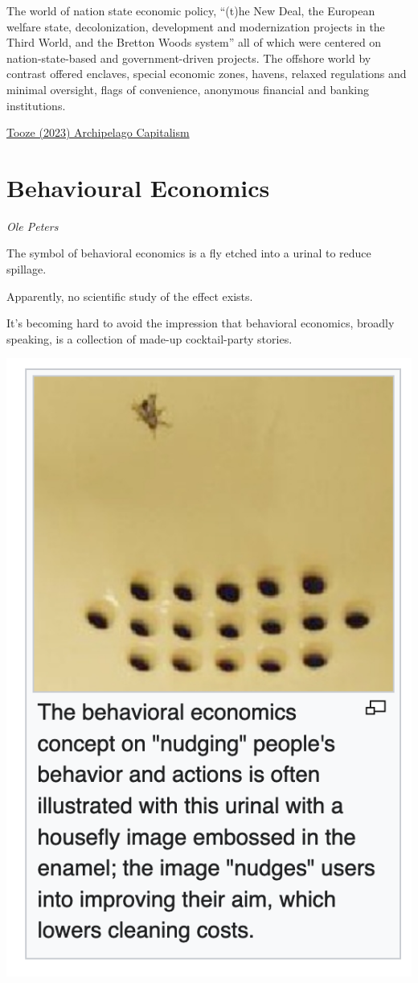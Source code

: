 \documentclass[
]{book}
\begin{document}
The world of nation state economic policy, ``(t)he New Deal, the European welfare state, decolonization, development and modernization projects in the Third World, and the Bretton Woods system'' all of which were centered on nation-state-based and government-driven projects. The offshore world by contrast offered enclaves, special economic zones, havens, relaxed regulations and minimal oversight, flags of convenience, anonymous financial and banking institutions.

\href{https://adamtooze.substack.com/p/chartbook-188-archipelago-capitalism}{Tooze (2023) Archipelago Capitalism}

\hypertarget{behavioural-economics}{%
\chapter{Behavioural Economics}\label{behavioural-economics}}

\emph{Ole Peters}

The symbol of behavioral economics is a fly etched into a urinal to reduce spillage.

Apparently, no scientific study of the effect exists.

It's becoming hard to avoid the impression that behavioral economics, broadly speaking, is a collection of made-up cocktail-party stories.

\includegraphics{fig/behavioural_urinal.png}
\end{document}
